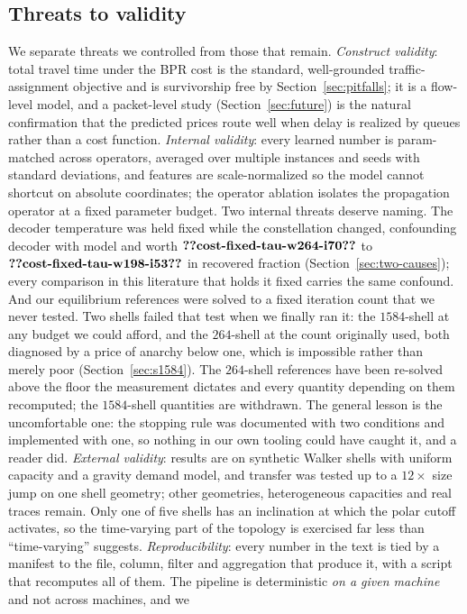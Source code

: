 \documentclass[journal]{IEEEtran}
\begin{document}
\subsection{Threats to validity}\label{sec:threats}
We separate threats we controlled from those that remain. \emph{Construct validity}:
total travel time under the BPR cost is the standard, well-grounded traffic-assignment
objective and is survivorship free by Section~\ref{sec:pitfalls}; it is a flow-level model,
and a packet-level study (Section~\ref{sec:future}) is the natural confirmation that the
predicted prices route well when delay is realized by queues rather than a cost function. \emph{Internal validity}: every
learned number is param-matched across operators, averaged over multiple instances and
seeds with standard deviations, and features are scale-normalized so the model cannot
shortcut on absolute coordinates; the operator ablation isolates the propagation operator
at a fixed parameter budget. Two internal threats deserve naming. The decoder temperature was held fixed while the constellation changed, confounding decoder with model and worth $\clm{cost-fixed-tau-w264-i70}$ to $\clm{cost-fixed-tau-w198-i53}$ in recovered fraction (Section~\ref{sec:two-causes}); every comparison in this literature that holds it fixed carries the same confound. And our equilibrium references were solved to a
fixed iteration count that we never tested. Two shells failed that test when we finally ran it:
the $1584$-shell at any budget we could afford, and the $264$-shell at the count originally
used, both diagnosed by a price of anarchy below one, which is impossible rather than merely
poor (Section~\ref{sec:s1584}). The $264$-shell references have been re-solved above the floor
the measurement dictates and every quantity depending on them recomputed; the $1584$-shell
quantities are withdrawn. The general lesson is the uncomfortable one: the stopping rule was
documented with two conditions and implemented with one, so nothing in our own tooling could
have caught it, and a reader did. \emph{External validity}: results are on synthetic Walker shells with uniform capacity and a gravity demand model, and transfer was tested up to a $12\times$ size jump on one shell geometry; other geometries, heterogeneous capacities and real traces remain. Only one of five shells has an inclination at which the polar cutoff activates, so the time-varying part of the topology is exercised far less than ``time-varying'' suggests.
\emph{Reproducibility}: every number in the text is tied by a manifest to the file, column,
filter and aggregation that produce it, with a script that recomputes all of them. The pipeline is deterministic \emph{on a given machine} and not across machines, and we
\end{document}
